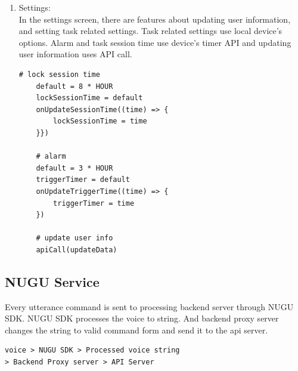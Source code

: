 \documentclass[conference]{IEEEtran}
\begin{document}
\begin{enumerate}
    \item Settings: \\
    In the settings screen, there are features about updating user information, and setting task related settings. Task related settings use local device's options. Alarm and task session time use device's timer API and updating user information uses API call.
    \begin{lstlisting}[frame=single]
    # lock session time
    default = 8 * HOUR
    lockSessionTime = default
    onUpdateSessionTime((time) => {
        lockSessionTime = time
    }})
    
    # alarm
    default = 3 * HOUR
    triggerTimer = default
    onUpdateTriggerTime((time) => {
        triggerTimer = time
    })
    
    # update user info
    apiCall(updateData)
    \end{lstlisting}

\end{enumerate}

\subsection{NUGU Service}

Every utterance command is sent to processing backend server through NUGU SDK. NUGU SDK processes the voice to string. And backend proxy server changes the string to valid command form and send it to the api server.

\begin{lstlisting}[frame=single]
voice > NUGU SDK > Processed voice string
> Backend Proxy server > API Server
\end{lstlisting}
\end{document}
